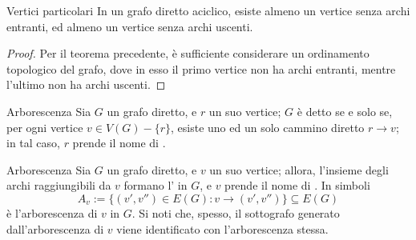 \documentclass[a4paper, 12pt]{report}
\begin{document}
    \begin{framedcor}[label={vertici particolari}]{Vertici particolari}
        In un grafo diretto aciclico, esiste almeno un vertice senza archi entranti, ed almeno un vertice senza archi uscenti.
    \end{framedcor}

    \begin{proof}
        Per il teorema precedente, è sufficiente considerare un ordinamento topologico del grafo, dove in esso il primo vertice non ha archi entranti, mentre l'ultimo non ha archi uscenti.
    \end{proof}

    \begin{frameddefn}{Arborescenza}
        Sia $G$ un grafo diretto, e $r$ un suo vertice; $G$ è detto  se e solo se, per ogni vertice $v \in V(G) - \{r\}$, esiste uno ed un solo cammino diretto $r \rightarrow v$; in tal caso, $r$ prende il nome di .
    \end{frameddefn}

    \begin{framedobs}{Arborescenza}
        Sia $G$ un grafo diretto, e $v$ un suo vertice; allora, l'insieme degli archi raggiungibili da $v$ formano l' in $G$, e $v$ prende il nome di . In simboli $$A_v := \{(v', v'') \in E(G) : v \rightarrow (v', v'')\} \subseteq E(G)$$ è l'arborescenza di $v$ in $G$. Si noti che, spesso, il sottografo generato dall'arborescenza di $v$ viene identificato con l'arborescenza stessa.
    \end{framedobs}
\end{document}
